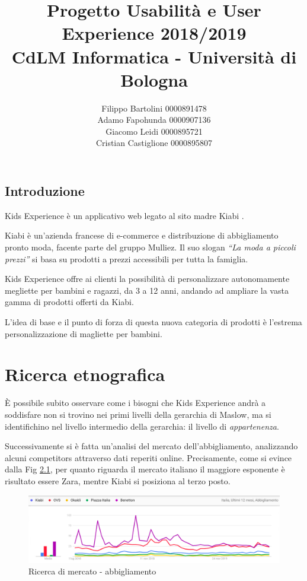 \documentclass[12pt,italian,]{report}
\title{Progetto Usabilità e User Experience 2018/2019\\[0.8em]\large CdLM Informatica - Università di Bologna}
\author{Filippo Bartolini 0000891478 \\ Adamo Fapohunda 0000907136\\ Giacomo Leidi 0000895721 \\ Cristian Castiglione 0000895807}
\date{}
\begin{document}
\maketitle

{
\setcounter{tocdepth}{2}
\tableofcontents
}
\newpage
\hypertarget{introduzione}{%
\section{Introduzione}\label{introduzione}}

Kids Experience è un applicativo web legato al sito madre Kiabi \cite{kiabi}.

Kiabi è un'azienda francese di e-commerce e distribuzione di
abbigliamento pronto moda, facente parte del gruppo Mulliez. Il suo
slogan \emph{``La moda a piccoli prezzi''} si basa su prodotti a prezzi
accessibili per tutta la famiglia.

Kids Experience offre ai clienti la possibilità di personalizzare
autonomamente megliette per bambini e ragazzi, da 3 a 12 anni, andando
ad ampliare la vasta gamma di prodotti offerti da Kiabi.

L'idea di base e il punto di forza di questa nuova categoria di prodotti è l'estrema personalizzazione di magliette per bambini.

\hypertarget{ricerca-etnografica}{%
\chapter{Ricerca etnografica}\label{ricerca-etnografica}}

È possibile subito osservare come i bisogni che Kids Experience andrà a
soddisfare non si trovino nei primi livelli della gerarchia di Maslow,
ma si identifichino nel livello intermedio della gerarchia: il livello
di \emph{appartenenza}.

Successivamente si è fatta un'analisi del mercato dell'abbigliamento,
analizzando alcuni competitors attraverso dati reperiti online.
Precisamente, come si evince dalla Fig \ref{abbigliamo_generico}, per quanto riguarda il
mercato italiano il maggiore esponente è risultato essere Zara, mentre Kiabi si
posiziona al terzo posto.

\begin{figure}[h]
\centering
\includegraphics{img/abbigliamento_generico.png}
\caption{Ricerca di mercato - abbigliamento}
\label{abbigliamo_generico}
\end{figure}
\end{document}
